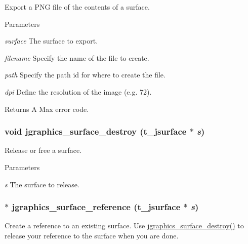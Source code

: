 Export a PNG file of the contents of a surface. 
\begin{DoxyParams}{Parameters}
\item[{\em surface}]The surface to export. \item[{\em filename}]Specify the name of the file to create. \item[{\em path}]Specify the path id for where to create the file. \item[{\em dpi}]Define the resolution of the image (e.g. 72). \end{DoxyParams}
\begin{DoxyReturn}{Returns}
A Max error code. 
\end{DoxyReturn}
\hypertarget{group__jsurface_ga0fb843ca88d59c3a1c933b18cca41524}{
\subsubsection[{jgraphics\_\-surface\_\-destroy}]{\setlength{\rightskip}{0pt plus 5cm}void jgraphics\_\-surface\_\-destroy ({\bf t\_\-jsurface} $\ast$ {\em s})}}
\label{group__jsurface_ga0fb843ca88d59c3a1c933b18cca41524}


Release or free a surface. 
\begin{DoxyParams}{Parameters}
\item[{\em s}]The surface to release. \end{DoxyParams}
\hypertarget{group__jsurface_gaf0948809cb6cc018e9f23e404ea9d271}{
\subsubsection[{jgraphics\_\-surface\_\-reference}]{$\ast$ jgraphics\_\-surface\_\-reference ({\bf t\_\-jsurface} $\ast$ {\em s})}}
\label{group__jsurface_gaf0948809cb6cc018e9f23e404ea9d271}


Create a reference to an existing surface. Use \hyperlink{group__jsurface_ga0fb843ca88d59c3a1c933b18cca41524}{jgraphics\_\-surface\_\-destroy()} to release your reference to the surface when you are done.


